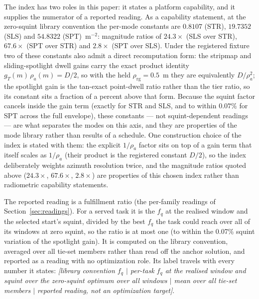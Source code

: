 \documentclass[preprint,authoryear]{elsarticle}
\begin{document}
The index has two roles in this paper: it states a platform capability, and it supplies the numerator of a reported reading. As a capability statement, at the zero-squint library convention the per-mode constants are $0.8107$ (STR), $19.7352$ (SLS) and $54.8322$ (SPT)~$\mathrm{m}^{-2}$: magnitude ratios of $24.3\times$ (SLS over STR), $67.6\times$ (SPT over STR) and $2.8\times$ (SPT over SLS). Under the registered fixture two of these constants also admit a direct recomputation form: the stripmap and sliding-spotlight dwell gains carry the exact product identity $g_T(m)\,\rho_a(m)=D/2$, so with the held $\rho_{\mathrm{rg}}=0.5$~m they are equivalently $D/\rho_a^{2}$; the spotlight gain is the tan-exact point-dwell ratio rather than the tier ratio, so its constant sits a fraction of a percent above that form. Because the squint factor cancels inside the gain term (exactly for STR and SLS, and to within $0.07\%$ for SPT across the full envelope), these constants --- not squint-dependent readings --- are what separates the modes on this axis, and they are properties of the mode library rather than results of a schedule. One construction choice of the index is stated with them: the explicit $1/\rho_a$ factor sits on top of a gain term that itself scales as $1/\rho_a$ (their product is the registered constant $D/2$), so the index deliberately weights azimuth resolution twice, and the magnitude ratios quoted above ($24.3\times$, $67.6\times$, $2.8\times$) are properties of this chosen index rather than radiometric capability statements.

The reported reading is a fulfillment ratio (the per-family readings of Section~\ref{sec:readings}). For a served task it is the $f_{q}$ at the realised window and the selected start's squint, divided by the best $f_{q}$ the task could reach over all of its windows at zero squint, so the ratio is at most one (to within the 0.07\% squint variation of the spotlight gain). It is computed on the library convention, averaged over all tie-set members rather than read off the anchor solution, and reported as a reading with no optimization role. Its label travels with every number it states: \emph{[library convention $f_{q}$ $\mid$ per-task $f_{q}$ at the realised window and squint over the zero-squint optimum over all windows $\mid$ mean over all tie-set members $\mid$ reported reading, not an optimization target]}.
\end{document}
